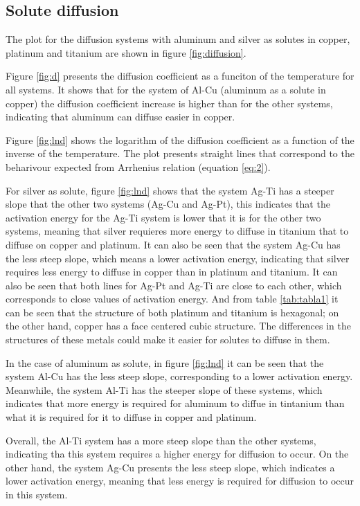 \subsection{Solute diffusion}

The plot for the diffusion systems with aluminum and silver as solutes in copper, platinum and titanium are shown in figure \ref{fig:diffusion}.

Figure \ref{fig:d} presents the diffusion coefficient as a funciton of the temperature for all systems. It shows that for the system of Al-Cu (aluminum as a solute in copper) the diffusion coefficient increase is higher than for the other systems, indicating that aluminum can diffuse easier in copper.

Figure \ref{fig:lnd} shows the logarithm of the diffusion coefficient as a function of the inverse of the temperature. The plot presents straight lines that correspond to the beharivour expected from Arrhenius relation (equation \ref{eq:2}). 

For silver as solute, figure \ref{fig:lnd} shows that the system Ag-Ti has a steeper slope that the other two systems (Ag-Cu and Ag-Pt), this indicates that the activation energy for the Ag-Ti system is lower that it is for the other two systems, meaning that silver requieres more energy to diffuse in titanium that to diffuse on copper and platinum. It can also be seen that the system Ag-Cu has the less steep slope, which means a lower activation energy, indicating that silver requires less energy to diffuse in copper than in platinum and titanium. It can also be seen that both lines for Ag-Pt and Ag-Ti are close to each other, which corresponds to close values of activation energy. And from table \ref{tab:tabla1} it can be seen that the structure of both platinum and titanium is hexagonal; on the other hand, copper has a face centered cubic structure. The differences in the structures of these metals could make it easier for solutes to diffuse in them.

In the case of aluminum as solute, in figure \ref{fig:lnd} it can be seen that the system Al-Cu has the less steep slope, corresponding to a lower activation energy. Meanwhile, the system Al-Ti has the steeper slope of these systems, which indicates that more energy is required for aluminum to diffue in tintanium than what it is required for it to diffuse in copper and platinum.

Overall, the Al-Ti system has a more steep slope than the other systems, indicating tha this system requires a higher energy for diffusion to occur. On the other hand, the system Ag-Cu presents the less steep slope, which indicates a lower activation energy, meaning that less energy is required for diffusion to occur in this system.

